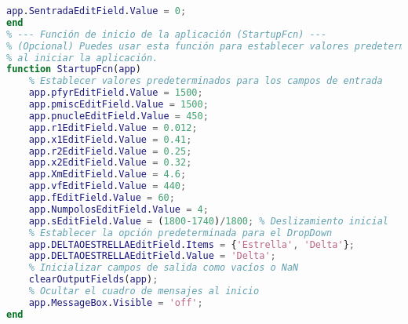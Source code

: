 \begin{lstlisting}[language=Matlab, caption={MATLAB Code}, basicstyle=\footnotesize\ttfamily]
    app.SentradaEditField.Value = 0;
end
% --- Función de inicio de la aplicación (StartupFcn) ---
% (Opcional) Puedes usar esta función para establecer valores predeterminados
% al iniciar la aplicación.
function StartupFcn(app)
    % Establecer valores predeterminados para los campos de entrada
    app.pfyrEditField.Value = 1500;
    app.pmiscEditField.Value = 1500;
    app.pnucleEditField.Value = 450;
    app.r1EditField.Value = 0.012;
    app.x1EditField.Value = 0.41;
    app.r2EditField.Value = 0.25;
    app.x2EditField.Value = 0.32;
    app.XmEditField.Value = 4.6;
    app.vfEditField.Value = 440;
    app.fEditField.Value = 60;
    app.NumpolosEditField.Value = 4;
    app.sEditField.Value = (1800-1740)/1800; % Deslizamiento inicial
    % Establecer la opción predeterminada para el DropDown
    app.DELTAOESTRELLAEditField.Items = {'Estrella', 'Delta'};
    app.DELTAOESTRELLAEditField.Value = 'Delta';
    % Inicializar campos de salida como vacíos o NaN
    clearOutputFields(app);
    % Ocultar el cuadro de mensajes al inicio
    app.MessageBox.Visible = 'off';
end
\end{lstlisting}





